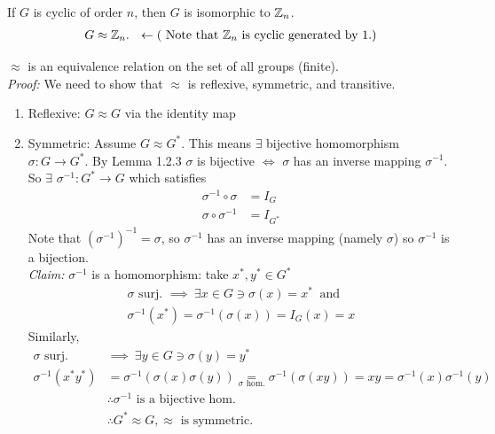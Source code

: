 \begin{corollary}
If $G$ is cyclic of order $n$, then $G$ is isomorphic to ${\mathbb{ Z}}_n$.\\
\begin{align}
    G\approx {\mathbb{ Z}}_n . \ \ \leftarrow (\text{ Note that }{\mathbb{ Z}}_n \text{ is cyclic generated by } 1.)\nonumber
\end{align}
\end{corollary}

\begin{proposition}
$\approx$ is an equivalence relation on the set of all groups (finite).\\
\textit{Proof:} We need to show that $\approx$ is reflexive, symmetric, and transitive.
\begin{enumerate}
    \item Reflexive: $G\approx G$ via the identity map
    \item Symmetric: Assume $G\approx G^*$. This means $\exists$ bijective homomorphism $\sigma: G\rightarrow G^*$. By Lemma 1.2.3 $\sigma$ is bijective $\iff$ $\sigma$ has an inverse mapping $\sigma^{-1}$. So $\exists$ $\sigma^{-1}: G^*\rightarrow G$ which satisfies
    \begin{align}
        \sigma^{-1}\circ \sigma &= I_G \nonumber \\
        \sigma\circ \sigma^{-1}&=I_{G^*}\nonumber
    \end{align}
    Note that $(\sigma^{-1})^{-1}=\sigma $, so $\sigma^{-1}$ has an inverse mapping (namely $\sigma$) so $\sigma^{-1}$ is a bijection.\\
    \textit{Claim:} $\sigma^{-1}$ is a homomorphism: take $x^*,y^*\in G^*$
    \begin{align}
        \sigma \text{ surj. } \implies \ \exists x\in G \ni \sigma(x)=x^* \ \text{ and} \nonumber \\
        \sigma^{-1}(x^*)=\sigma^{-1}(\sigma(x))=I_G(x)=x \nonumber
    \end{align}
    Similarly,
    \begin{align}
        \sigma \text{ surj. }&\implies \ \exists y\in G \ni \sigma(y)=y^* \nonumber \\
        \sigma^{-1}(x^*y^*)&=\sigma^{-1}(\sigma(x)\sigma(y))\underset{\sigma \text{ hom.}}{=}\sigma^{-1}(\sigma(xy))=xy=\sigma^{-1}(x)\sigma^{-1}(y) \nonumber \\
        &\therefore \sigma^{-1} \text{ is a bijective hom.} \nonumber \\
        &\therefore G^*\approx G, \approx \text{ is symmetric}. \nonumber

\end{align}
\end{enumerate}
\end{proposition}

